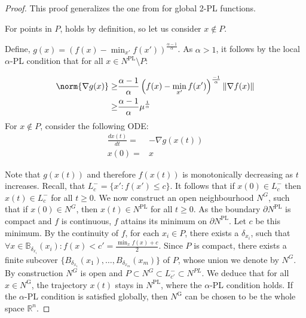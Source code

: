 \documentclass{article}
\newcommand{\R}{\mathbb{R}}
\newcommand{\B}{\mathbb{B}}
\begin{document}
\begin{proof}
    This proof generalizes the one from \citet{Karimi2016Lineara} for global 2-PL functions.

    For points in $P$,  holds by definition, so let us consider $x \notin P$.

    Define, $g(x)=\left( f(x)- \min_{x'}f(x')\right)^{\frac{\alpha-1} {\alpha}}$. As $\alpha>1$, it follows by the local $\alpha$-PL condition that for all $x\in N^{\text{PL}}\setminus P$:

    \begin{equation}
        \label{eq:GPL}
            \begin{aligned}
        \norm{\nabla g(x)}\geq & \frac{\alpha-1}{\alpha} \left( f(x)- \min_{x'}f(x')\right)^{\frac{-1}{\alpha}} \|\nabla f(x)\|\\
        \geq & \frac{\alpha-1}{\alpha} \mu ^ {\frac{1}{\alpha}} 
    \end{aligned}
\end{equation}
    For $x \notin P$, consider the following ODE:
    \begin{align*}
        \frac{dx(t)}{dt}=&-\nabla g(x(t))\\
        x(0)=& x
    \end{align*}

    Note that $g(x(t))$ and therefore $f(x(t))$ is monotonically decreasing as $t$ increases. Recall, that $L_c^-=\{x': f(x')\leq c\}$. It follows that if $x(0) \in L_c^-$ then $x(t)\in L_c^-$ for all $t\geq 0$. We now construct an open neighbourhood $N^G$, such that if $x(0)\in N^G$, then $x(t)\in N^{\text{PL}}$ for all $t\geq 0$. 
    As the boundary $\partial N^{\text{PL}}$ is compact and $f$ is continuous, $f$ attains its minimum on $\partial N^{\text{PL}}$. Let $c$ be this minimum.
    By the continuity of $f$, for each $x_i\in P$, there exists a $\delta_{x_i}$, such that $\forall x\in \B_{\delta_{x_i}}(x_i): f(x) < c'=\frac{\min_x f(x)+c}{2}$. Since $P$ is compact, there exists a finite subcover $\{B_{\delta_{x_1}}(x_1),\dots,B_{\delta_{x_m}}(x_m)\}$ of $P$, whose union we denote by $N^G$. By construction $N^G$ is open and $P \subset N^G \subset L_{c'}^- \subset N^{PL}$. We deduce that for all $x \in N^{\text{G}}$, the trajectory $x(t)$ stays in $N^{\text{PL}}$, where the $\alpha$-PL condition holds. If the $\alpha$-PL condition is satisfied globally, then $N^{\text{G}}$ can be chosen to be the whole space $\R^n$.



   


\end{proof}
\end{document}
